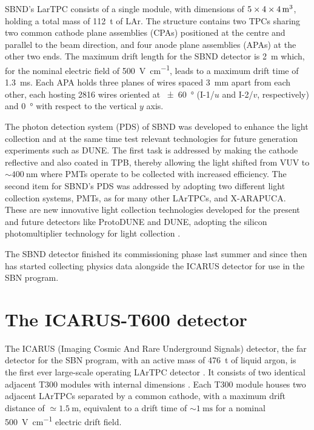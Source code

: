 SBND's LarTPC consists of a single module, with dimensions of $\qtyproduct[product-units = power]{5x4x4}{\meter}$, holding a total mass of \SI{112}{\tonne} of LAr. The structure contains two TPCs sharing two common cathode plane assemblies (CPAs) positioned at the centre and parallel to the beam direction, and four anode plane assemblies (APAs) at the other two ends. The maximum drift length for the SBND detector is \SI{2}{\meter} which, for the nominal electric field of \SI{500}{\volt\per\cm}, leads to a maximum drift time of \SI{1.3}{\ms}. Each APA holds three planes of wires spaced \SI{3}{\mm} apart from each other, each hosting \num{2816} wires oriented at \SI{+-60}{\degree} (I-1/$u$ and I-2/$v$, respectively) and \SI{0}{\degree} with respect to the vertical $y$ axis. 

The photon detection system (PDS) of SBND was developed to enhance the light collection and at the same time test relevant technologies for future generation experiments such as DUNE. The first task is addressed by making the cathode reflective and also coated in TPB, thereby allowing the light shifted from VUV to ${\sim}\SI{400}{\nm}$ where PMTs operate to be collected with increased efficiency. The second item for SBND's PDS was addressed by adopting two different light collection systems, PMTs, as for many other LArTPCs, and X-ARAPUCA. These are new innovative light collection technologies developed for the present and future detectors like ProtoDUNE and DUNE, adopting the silicon photomultiplier technology for light collection \cite{Bonivento:2024qpn}. 

The SBND detector finished its commissioning phase last summer and since then has started collecting physics data alongside the ICARUS detector for use in the SBN program. 

\section{The ICARUS-T600 detector}  \label{sec:ICARUS_T600}

The ICARUS (Imaging Cosmic And Rare Underground Signals) detector, the far detector for the SBN program, with an active mass of \SI{476}{\tonne} of liquid argon, is the first ever large-scale operating LArTPC detector \cite{amerioDesignConstructionTests2004c}. It consists of two identical adjacent T300 modules with internal dimensions . Each T300 module houses two adjacent LArTPCs separated by a common cathode, with a maximum drift distance of $\simeq\SI{1.5}{\m}$, equivalent to a drift time of ${\sim}\SI{1}{\ms}$ for a nominal \SI{500}{\volt\per\cm} electric drift field.

